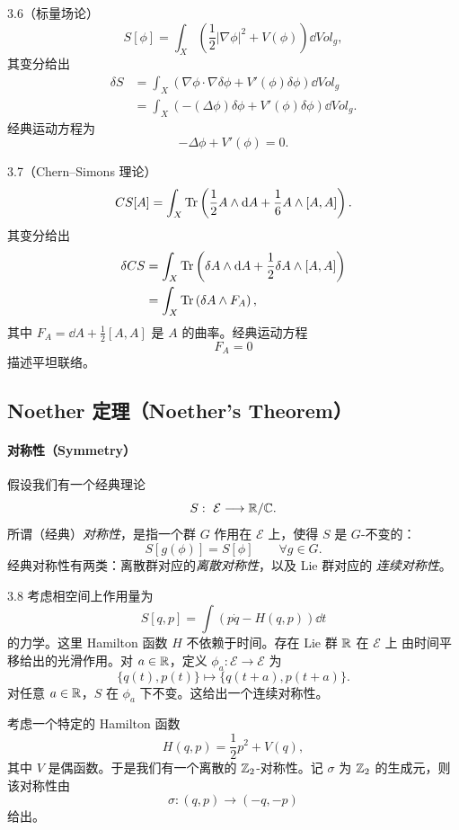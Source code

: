 \begin{wexam}{3.6}（标量场论）
  \[
    S[\phi]=\int_{X}\left(\frac{1}{2}|\nabla\phi|^{2}+V(\phi)\right)\dd Vol_{g},
  \]
  其变分给出
  \[
    \begin{aligned}
      \delta S&=\int_{X}\left(\nabla\phi\cdot\nabla\delta\phi
      +V'(\phi)\delta\phi\right)\dd Vol_{g}\\
      &=\int_{X}\left(-(\Delta\phi)\delta\phi+V'(\phi)\delta\phi\right)\dd Vol_{g}.
    \end{aligned}
  \]
  经典运动方程为
  \[
    -\Delta\phi+V'(\phi)=0.
  \]
\end{wexam}

\begin{wexam}{3.7}（Chern--Simons 理论）
  \[
    CS[A]=\int_{X}\operatorname{Tr}\left(\frac{1}{2}A\wedge\mathrm{d} A
    +\frac{1}{6}A\wedge[A,A]\right).
  \]
  其变分给出
  \[
    \begin{aligned}
      \delta CS&=\int_{X}\operatorname{Tr}\left(\delta A\wedge\mathrm{d} A
      +\frac{1}{2}\delta A\wedge[A,A]\right)\\
      &=\int_{X}\operatorname{Tr}\left(\delta A\wedge F_{A}\right),
    \end{aligned}
  \]
  其中 $F_{A}=\dd A+\frac{1}{2}[A,A]$ 是 $A$ 的曲率。经典运动方程
  \[
    F_{A}=0
  \]
  描述平坦联络。
\end{wexam}

\subsection{Noether 定理（Noether's Theorem）}

\paragraph{对称性（Symmetry）}

假设我们有一个经典理论
\[
  S:\ \mathcal{E}\longrightarrow\R/\C.
\]
所谓（经典）\emph{对称性}，是指一个群 $G$ 作用在 $\mathcal{E}$ 上，使得 $S$ 是
$G$-不变的：
\[
  S[g(\phi)]=S[\phi]\qquad \forall g\in G.
\]
经典对称性有两类：离散群对应的\emph{离散对称性}，以及 Lie 群对应的
\emph{连续对称性}。

\begin{wexam}{3.8}
  考虑相空间上作用量为
  \[
    S[q,p]=\int\left(p\dot q-H(q,p)\right)\dd t
  \]
  的力学。这里 Hamilton 函数 $H$ 不依赖于时间。存在 Lie 群 $\mathbb{R}$ 在 $\mathcal{E}$ 上
  由时间平移给出的光滑作用。对 $a\in\mathbb{R}$，定义 $\phi_{a}:\mathcal{E}\to\mathcal{E}$ 为
  \[
    \{q(t),p(t)\}\longmapsto\{q(t+a),p(t+a)\}.
  \]
  对任意 $a\in\mathbb{R}$，$S$ 在 $\phi_{a}$ 下不变。这给出一个连续对称性。

  考虑一个特定的 Hamilton 函数
  \[
    H(q,p)=\frac{1}{2}p^{2}+V(q),
  \]
  其中 $V$ 是偶函数。于是我们有一个离散的 $\mathbb{Z}_{2}$-对称性。记 $\sigma$ 为
  $\mathbb{Z}_{2}$ 的生成元，则该对称性由
  \[
    \sigma:(q,p)\to(-q,-p)
  \]
  给出。
\end{wexam}

